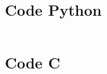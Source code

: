 \documentclass[a4paper, 11pt]{article} %
\begin{document}
\inputminted[fontsize=\small,linenos]{python}{./code/sample.py}

\subsection{Code Python}

\inputminted[fontsize=\footnotesize,linenos]{python}{./code/picker.py}

\subsection{Code C}

\inputminted[fontsize=\footnotesize,linenos]{c}{./code/stalta.c}

\newpage 



\end{document}
